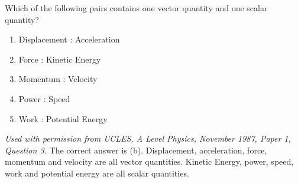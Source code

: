 \begin{problem} 
{Which of the following pairs contains one vector quantity and one scalar quantity?
\begin{enumerate}
	\item Displacement \quad : \quad Acceleration
	\item Force \quad : \quad Kinetic Energy
	\item Momentum \quad : \quad Velocity
	\item Power \quad : \quad Speed
	\item Work \quad : \quad Potential Energy
\end{enumerate}
}
{\textit{Used with permission from UCLES, A Level Physics, November 1987, Paper 1, Question 3.}}
{The correct answer is (b). Displacement, acceleration, force, momentum and velocity are all vector quantities. Kinetic Energy, power, speed, work and potential energy are all scalar quantities.}
\end{problem}